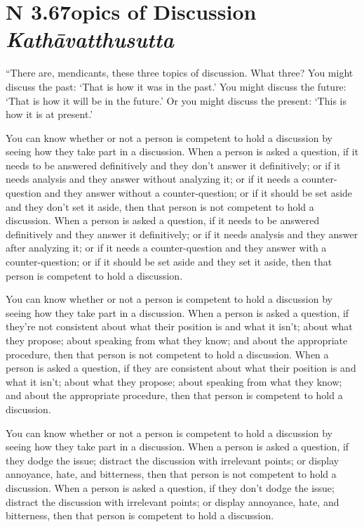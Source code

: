 \documentclass[12pt,openany]{book}%
\newcommand*{\suttatitleacronym}[1]{\smaller[2]{#1}\vspace*{.3em}}
\newcommand*{\suttatitletranslation}[1]{\linebreak{#1}}
\newcommand*{\suttatitleroot}[1]{\linebreak\smaller[2]\itshape{#1}}
\newcommand*{\tocacronym}[1]{\hspace*{-3.3em}{#1}\quad}
\newcommand*{\toctranslation}[1]{#1}
\newcommand*{\tocroot}[1]{(\textit{#1})}
\begin{document}
%
\section*{{\suttatitleacronym AN 3.67}{\suttatitletranslation Topics of Discussion }{\suttatitleroot Kathāvatthusutta}}
\addcontentsline{toc}{section}{\tocacronym{AN 3.67} \toctranslation{Topics of Discussion } \tocroot{Kathāvatthusutta}}

“There are, mendicants, these three topics of discussion. What three? You might discuss the past: ‘That is how it was in the past.’ You might discuss the future: ‘That is how it will be in the future.’ Or you might discuss the present: ‘This is how it is at present.’ 

You can know whether or not a person is competent to hold a discussion by seeing how they take part in a discussion. When a person is asked a question, if it needs to be answered definitively and they don’t answer it definitively; or if it needs analysis and they answer without analyzing it; or if it needs a counter-question and they answer without a counter-question; or if it should be set aside and they don’t set it aside, then that person is not competent to hold a discussion. When a person is asked a question, if it needs to be answered definitively and they answer it definitively; or if it needs analysis and they answer after analyzing it; or if it needs a counter-question and they answer with a counter-question; or if it should be set aside and they set it aside, then that person is competent to hold a discussion. 

You can know whether or not a person is competent to hold a discussion by seeing how they take part in a discussion. When a person is asked a question, if they’re not consistent about what their position is and what it isn’t; about what they propose; about speaking from what they know; and about the appropriate procedure, then that person is not competent to hold a discussion. When a person is asked a question, if they are consistent about what their position is and what it isn’t; about what they propose; about speaking from what they know; and about the appropriate procedure, then that person is competent to hold a discussion. 

You can know whether or not a person is competent to hold a discussion by seeing how they take part in a discussion. When a person is asked a question, if they dodge the issue; distract the discussion with irrelevant points; or display annoyance, hate, and bitterness, then that person is not competent to hold a discussion. When a person is asked a question, if they don’t dodge the issue; distract the discussion with irrelevant points; or display annoyance, hate, and bitterness, then that person is competent to hold a discussion. 
\end{document}
